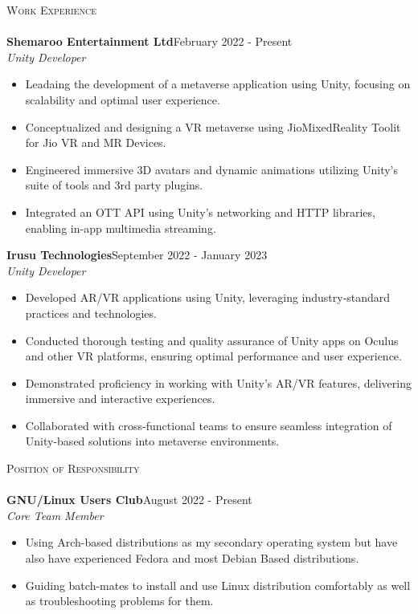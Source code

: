 \documentclass[a4paper]{article}
\newcommand{\lineunder} {
    \vspace*{-8pt} \\
    \hspace*{-18pt} \hrulefill \\
}
\newcommand{\header} [1] {
    {\hspace*{-18pt}\vspace*{6pt} \textsc{#1}}
    \vspace*{-6pt} \lineunder
}
\begin{document}
\header{Work Experience}
\vspace{0mm}
\textbf{Shemaroo Entertainment Ltd}\hfill February 2022 - Present\\
{\textit {Unity Developer}} 
\vspace{-2.5mm}
\begin{itemize} 
	\item Leadaing the development of a metaverse application using Unity, focusing on scalability and optimal user experience.
 \vspace{-2.5mm}
        \item Conceptualized and designing a VR metaverse using JioMixedReality Toolit for Jio VR and MR Devices.
 \vspace{-2.5mm}
        \item Engineered immersive 3D avatars and dynamic animations utilizing Unity's suite of tools and 3rd party plugins.
 \vspace{-2.5mm}
        \item Integrated an OTT API using Unity's networking and HTTP libraries, enabling in-app multimedia streaming.
 \vspace{-2.5mm} 
\end{itemize}
\textbf{Irusu Technologies}\hfill September 2022 - January 2023\\
{\textit {Unity Developer}} 
\vspace{-2.5mm}
\begin{itemize} 
	\item Developed AR/VR applications using Unity, leveraging industry-standard practices and technologies.
 \vspace{-2.5mm}
        \item Conducted thorough testing and quality assurance of Unity apps on Oculus and other VR platforms, ensuring optimal performance and user experience.
 \vspace{-2.5mm}
        \item Demonstrated proficiency in working with Unity's AR/VR features, delivering immersive and interactive experiences.
 \vspace{-2.5mm}
        \item Collaborated with cross-functional teams to ensure seamless integration of Unity-based solutions into metaverse environments.
\end{itemize}
\vspace{1mm}
\header{Position of Responsibility}
\vspace{0mm}
\textbf{GNU/Linux Users Club}\hfill August 2022 - Present\\
{\textit {Core Team Member}}  
\vspace{-1mm}
\begin{itemize} 
	\item Using Arch-based distributions as my secondary operating system but have also have experienced Fedora and most Debian Based distributions.
        \item Guiding batch-mates to install and use Linux distribution comfortably as well as troubleshooting problems for them. 
\end{itemize}
\end{document}
